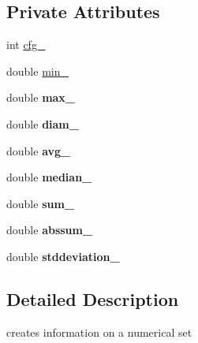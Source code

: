 \subsection*{Private Attributes}
\begin{CompactItemize}
\item 
int \hyperlink{class_num_set_stats_a70473f5a35e86e19224550b7a919871}{cfg\_\-}
\item 
double \hyperlink{class_num_set_stats_e268eba5a003e3932b16e90ce8bad405}{min\_\-}
\item 
\hypertarget{class_num_set_stats_f5f15a621edab3e612c2d7430c78f892}{
double \textbf{max\_\-}}
\label{class_num_set_stats_f5f15a621edab3e612c2d7430c78f892}

\item 
\hypertarget{class_num_set_stats_87b5909c45d4fbe93fc16ab142e93bf6}{
double \textbf{diam\_\-}}
\label{class_num_set_stats_87b5909c45d4fbe93fc16ab142e93bf6}

\item 
\hypertarget{class_num_set_stats_1f384a596365ae07382cc5301493fe4a}{
double \textbf{avg\_\-}}
\label{class_num_set_stats_1f384a596365ae07382cc5301493fe4a}

\item 
\hypertarget{class_num_set_stats_def1065f51479ef02a8f4dbdc0f28c2c}{
double \textbf{median\_\-}}
\label{class_num_set_stats_def1065f51479ef02a8f4dbdc0f28c2c}

\item 
\hypertarget{class_num_set_stats_50d3d004ede70cd212499d5568f1fdc6}{
double \textbf{sum\_\-}}
\label{class_num_set_stats_50d3d004ede70cd212499d5568f1fdc6}

\item 
\hypertarget{class_num_set_stats_9a1f6e0f9634df90757a34da7ba9e7d7}{
double \textbf{abssum\_\-}}
\label{class_num_set_stats_9a1f6e0f9634df90757a34da7ba9e7d7}

\item 
\hypertarget{class_num_set_stats_a4ae52c9e1debca8595801eddb27e202}{
double \textbf{stddeviation\_\-}}
\label{class_num_set_stats_a4ae52c9e1debca8595801eddb27e202}

\end{CompactItemize}


\subsection{Detailed Description}
creates information on a numerical set 

